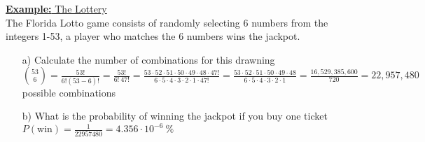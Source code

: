 \documentclass[a4paper]{article}
\let\bf\textbf
\begin{document}
\begin{shaded}
    \underline{\bf{Example:} The Lottery}
    \vspace{2mm}\\
    The Florida Lotto game consists of randomly selecting 6 numbers from the integers 1-53, a player who matches the 6 numbers wins the jackpot.
    \begin{itemize}
        \item[a)] Calculate the number of combinations for this drawning\\
        $\displaystyle \binom{53}{6} = \frac{53!}{6!(53-6)!} = \frac{53!}{6!\ 47!} = \frac{53 \cdot 52 \cdot 51 \cdot 50 \cdot 49 \cdot 48 \cdot 47!}{6 \cdot 5 \cdot 4 \cdot 3 \cdot 2 \cdot 1 \cdot 47!} = \frac{53 \cdot 52 \cdot 51 \cdot 50 \cdot 49 \cdot 48}{6 \cdot 5 \cdot 4 \cdot 3 \cdot 2 \cdot 1} = \frac{16,529,385,600}{720} = 22,957,480$ possible combinations
        \item[b)] What is the probability of winning the jackpot if you buy one ticket\\
        $\displaystyle P(\text{win}) = \frac{1}{22957480} = 4.356 \cdot 10^{-6}\ \%$
    \end{itemize}
\end{shaded}
\end{document}
